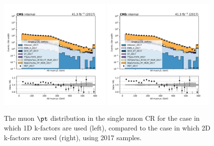 \begin{figure}
    \begin{center}
        \includegraphics[width=0.49\textwidth]{fig/datamc/cr_1m_vbf/cr_1m_vbf_muon_pt_losf_2017.pdf}
        \includegraphics[width=0.49\textwidth]{fig/datamc_2dkfac/cr_1m_vbf/cr_1m_vbf_muon_pt_losf_2017.pdf} 
        \caption{The muon $\pt$ distribution in the single muon CR for the case in which 1D k-factors are used (left), 
        compared to the case in which 2D k-factors are used (right), using 2017 samples.}
        \label{fig:muon_pt_2017}
    \end{center}
\end{figure}

